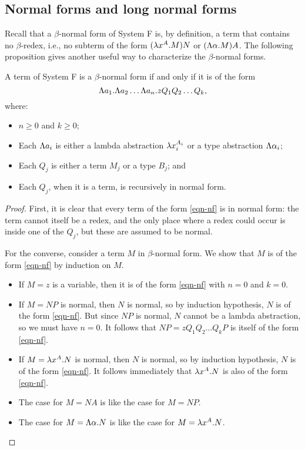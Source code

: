 \documentclass{article}
\begin{document}
\subsection{Normal forms and long normal forms}

Recall that a $\beta$-normal form of System F is, by definition, a
term that contains no $\beta$-redex, i.e., no subterm of the form
$(\lambda x^{A}.M)N$ or $(\Lambda\alpha.M)A$. The following
proposition gives another useful way to characterize the
$\beta$-normal forms.

\begin{proposition}
  A term of System F is a $\beta$-normal form if and only if it is of
  the form
  \begin{equation}\label{eqn-nf}
    \Lambda a_1.\Lambda a_2\ldots\Lambda a_n.zQ_1Q_2\ldots Q_k,
  \end{equation}
  where:\rm
  \begin{itemize}
  \item $n\geq 0$ and $k\geq 0$;
  \item Each $\Lambda a_i$ is either a lambda abstraction
    $\lambda x_i^{A_i}$ or a type abstraction $\Lambda\alpha_i$;
  \item Each $Q_j$ is either a term $M_j$ or a type $B_j$; and
  \item Each $Q_j$, when it is a term, is recursively in normal form.
  \end{itemize}
\end{proposition}

\begin{proof}
  First, it is clear that every term of the form {\eqref{eqn-nf}} is
  in normal form: the term cannot itself be a redex, and the only
  place where a redex could occur is inside one of the $Q_j$, but
  these are assumed to be normal. 

  For the converse, consider a term $M$ in $\beta$-normal form. We
  show that $M$ is of the form {\eqref{eqn-nf}} by induction on $M$. 
  \begin{itemize}
  \item If $M=z$ is a variable, then it is of the form
    {\eqref{eqn-nf}} with $n=0$ and $k=0$.
  \item If $M=NP$ is normal, then $N$ is normal, so
    by induction hypothesis, $N$ is of the form {\eqref{eqn-nf}}. But
    since $NP$ is normal, $N$ cannot be a lambda abstraction, so we
    must have $n=0$. It follows that $NP=zQ_1Q_2\ldots Q_kP$ is itself
    of the form {\eqref{eqn-nf}}.
  \item If $M=\lambda x^{A}.N$ is normal, then $N$ is normal, so by
    induction hypothesis, $N$ is of the form {\eqref{eqn-nf}}. It
    follows immediately that $\lambda x^{A}.N$ is also of the form
    {\eqref{eqn-nf}}.
  \item The case for $M=NA$ is like the case for $M=NP$. 
  \item The case for $M=\Lambda\alpha.N$ is like the case for
    $M=\lambda x^{A}.N$.\eot
  \end{itemize}
\end{proof}
\end{document}
